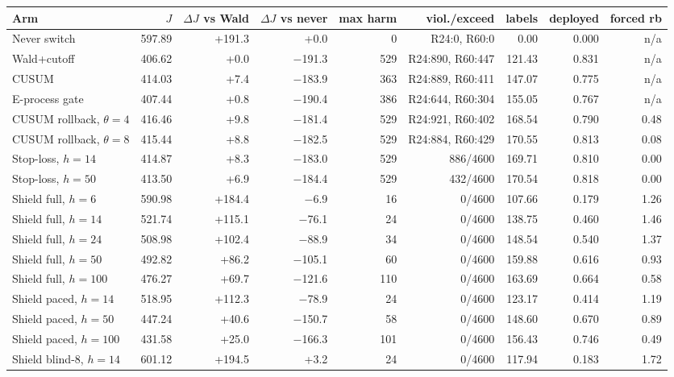 \begin{tabular}{@{}l r r r r r r r r@{}}
\toprule
Arm & $J$ & $\Delta J$ vs Wald & $\Delta J$ vs never & max harm & viol./exceed & labels & deployed & forced rb \\
\midrule
Never switch & 597.89 & +191.3 & +0.0 & 0 & R24:0, R60:0 & 0.00 & 0.000 & n/a \\
Wald+cutoff & 406.62 & +0.0 & $-$191.3 & 529 & R24:890, R60:447 & 121.43 & 0.831 & n/a \\
CUSUM & 414.03 & +7.4 & $-$183.9 & 363 & R24:889, R60:411 & 147.07 & 0.775 & n/a \\
E-process gate & 407.44 & +0.8 & $-$190.4 & 386 & R24:644, R60:304 & 155.05 & 0.767 & n/a \\
CUSUM rollback, $\theta=4$ & 416.46 & +9.8 & $-$181.4 & 529 & R24:921, R60:402 & 168.54 & 0.790 & 0.48 \\
CUSUM rollback, $\theta=8$ & 415.44 & +8.8 & $-$182.5 & 529 & R24:884, R60:429 & 170.55 & 0.813 & 0.08 \\
Stop-loss, $h=14$ & 414.87 & +8.3 & $-$183.0 & 529 & 886/4600 & 169.71 & 0.810 & 0.00 \\
Stop-loss, $h=50$ & 413.50 & +6.9 & $-$184.4 & 529 & 432/4600 & 170.54 & 0.818 & 0.00 \\
Shield full, $h=6$ & 590.98 & +184.4 & $-$6.9 & 16 & 0/4600 & 107.66 & 0.179 & 1.26 \\
Shield full, $h=14$ & 521.74 & +115.1 & $-$76.1 & 24 & 0/4600 & 138.75 & 0.460 & 1.46 \\
Shield full, $h=24$ & 508.98 & +102.4 & $-$88.9 & 34 & 0/4600 & 148.54 & 0.540 & 1.37 \\
Shield full, $h=50$ & 492.82 & +86.2 & $-$105.1 & 60 & 0/4600 & 159.88 & 0.616 & 0.93 \\
Shield full, $h=100$ & 476.27 & +69.7 & $-$121.6 & 110 & 0/4600 & 163.69 & 0.664 & 0.58 \\
Shield paced, $h=14$ & 518.95 & +112.3 & $-$78.9 & 24 & 0/4600 & 123.17 & 0.414 & 1.19 \\
Shield paced, $h=50$ & 447.24 & +40.6 & $-$150.7 & 58 & 0/4600 & 148.60 & 0.670 & 0.89 \\
Shield paced, $h=100$ & 431.58 & +25.0 & $-$166.3 & 101 & 0/4600 & 156.43 & 0.746 & 0.49 \\
Shield blind-8, $h=14$ & 601.12 & +194.5 & +3.2 & 24 & 0/4600 & 117.94 & 0.183 & 1.72 \\
\bottomrule
\end{tabular}
